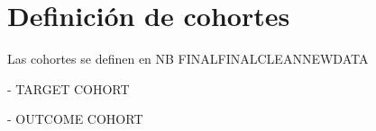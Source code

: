 \chapter{Definición de cohortes} \label{cap:05cohortes}

Las cohortes se definen en NB FINALFINALCLEANNEWDATA


- TARGET COHORT

- OUTCOME COHORT